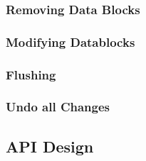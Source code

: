 
\subsubsection{Removing Data Blocks}%
\label{sec:RemovingDatablocks}%

\subsubsection{Modifying Datablocks}%
\label{sec:ModifyingDatablocks}%

\subsubsection{Flushing}%
\label{sec:Flushing}%

\subsubsection{Undo all Changes}%
\label{sec:UndoallChanges}%

\subsection{API Design}%
\label{sec:APIDesign}%












%
%

